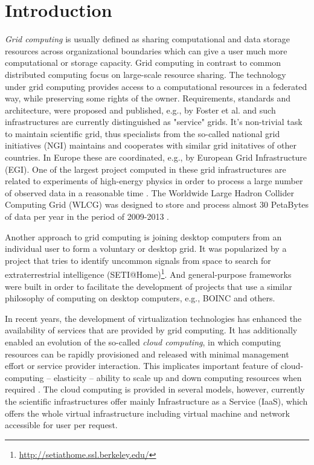 \chapter{Introduction}

\emph{Grid computing} is usually defined as sharing computational and data storage resources across organizational boundaries which can give a user much more computational or storage capacity. Grid computing in contrast to common distributed computing focus on large-scale resource sharing. The technology under grid computing provides access to a computational resources in a federated way, while preserving some rights of the owner. Requirements, standards and architecture, were proposed and published, e.g., by Foster et al. \cite{Foster2001, Foster2003} and such infrastructures are currently distinguished as "service" grids. It's non-trivial task to maintain scientific grid, thus specialists from the so-called national grid initiatives (NGI) maintains and cooperates with similar grid initatives of other countries. In Europe these are coordinated, e.g., by European Grid Infrastructure (EGI). One of the largest project computed in these grid infrastructures are related to experiments of high-energy physics in order to process a large number of observed data in a reasonable time \cite{Bird2009}. The Worldwide Large Hadron Collider Computing Grid (WLCG) was designed to store and process almost 30 PetaBytes of data per year in the period of 2009-2013  \cite{Adamova2014}.

Another approach to grid computing is joining desktop computers from an individual user to form a voluntary or desktop grid. It was popularized by a project that tries to identify uncommon signals from space to search for extraterrestrial intelligence (SETI@Home)\footnote{\url{http://setiathome.ssl.berkeley.edu/}}\cite{Anderson2002}. And general-purpose frameworks were built in order to facilitate the development of projects that use a similar philosophy of computing on desktop computers, e.g., BOINC \cite{Anderson2004} and others.

In recent years, the development of virtualization technologies has enhanced the availability of services that are provided by grid computing. It has additionally enabled an evolution of the so-called \emph{cloud computing}, in which computing resources can be rapidly provisioned and released with minimal management effort or service provider interaction. This implicates important feature of cloud-computing -- elasticity -- ability to scale up and down computing resources when required \cite{Mell2011}. The cloud computing is provided in several models, however, currently the scientific infrastructures offer mainly Infrastructure as a Service (IaaS), which offers the whole virtual infrastructure including virtual machine and network accessible for user per request.

